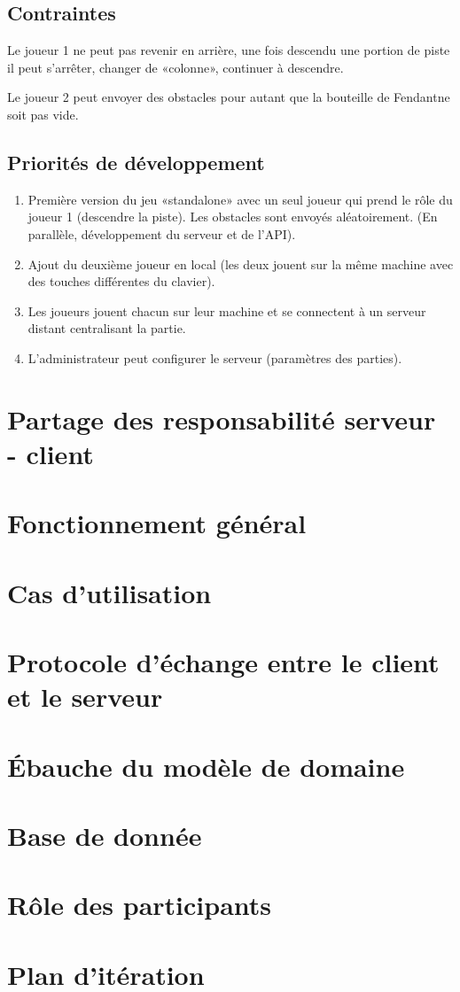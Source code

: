 \documentclass[a4paper,11pt]{article}
\begin{document}
	\subsection{Contraintes}
	Le joueur 1 ne peut pas revenir en arrière, une fois descendu une portion de piste il peut s'arrêter, changer de «colonne», continuer à descendre. \par

	Le joueur 2 peut envoyer des obstacles pour autant que la bouteille de Fendant\texttrademark ne soit pas vide.

	\subsection{Priorités de développement}

	\begin{enumerate}
		\item Première version du jeu «standalone» avec un seul joueur qui prend le rôle du joueur 1 (descendre la piste). Les obstacles sont envoyés aléatoirement. (En parallèle, développement du serveur et de l'API).
		\item Ajout du deuxième joueur en local (les deux jouent sur la même machine avec des touches différentes du clavier).
		\item Les joueurs jouent chacun sur leur machine et se connectent à un serveur distant centralisant la partie.
		\item L'administrateur peut configurer le serveur (paramètres des parties).
	\end{enumerate}

	\section{Partage des responsabilité serveur - client}

	\section{Fonctionnement général}

	\section{Cas d'utilisation}

	\section{Protocole d'échange entre le client et le serveur}

	\section{Ébauche du modèle de domaine}

	\section{Base de donnée}

	\section{Rôle des participants}

	\section{Plan d'itération}
\end{document}
